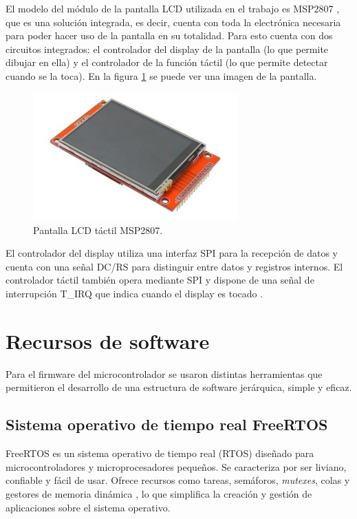 El modelo del módulo de la pantalla LCD utilizada en el trabajo es MSP2807 \citep{MSP2807}, que es una solución integrada, es decir, cuenta con toda la electrónica necesaria para poder hacer uso de la pantalla en su totalidad. Para esto cuenta con dos circuitos integrados: el controlador del display de la pantalla (lo que permite dibujar en ella) y el controlador de la función táctil (lo que permite detectar cuando se la toca). En la figura \ref{fig:pantLCD} se puede ver una imagen de la pantalla.

\begin{figure}[H]
\centering
\includegraphics[width=0.7\textwidth]{./Figures/pant_LCD.png}
\caption{Pantalla LCD táctil MSP2807\protect\footnotemark.}
\label{fig:pantLCD}
\end{figure}


El controlador del display utiliza una interfaz SPI para la recepción de datos y cuenta con una señal DC/RS para distinguir entre datos y registros internos. El controlador táctil también opera mediante SPI y dispone de una señal de interrupción T\_IRQ que indica cuando el display es tocado \citep{MSP2807}.

\section{Recursos de software}

Para el firmware del microcontrolador se usaron distintas herramientas que permitieron el desarrollo de una estructura de software jerárquica, simple y eficaz.

\subsection{Sistema operativo de tiempo real FreeRTOS}

FreeRTOS es un sistema operativo de tiempo real (RTOS) diseñado para microcontroladores y microprocesadores pequeños. Se caracteriza por ser liviano, confiable y fácil de usar. Ofrece recursos como tareas, semáforos, \textit{mutexes}, colas y gestores de memoria dinámica \citep{WEBSITE:1}, lo que simplifica la creación y gestión de aplicaciones sobre el sistema operativo.

